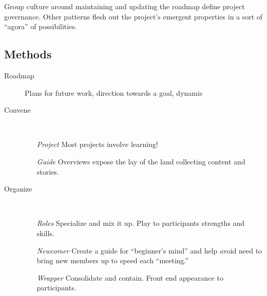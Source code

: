 \documentclass{acm_proc_article-sp}
\begin{document}
Group culture around maintaining and updating the roadmap define
project governance.  Other patterns flesh out the project's emergent
properties in a sort of ``agora'' of possibilities.

\subsection{Methods}

\hspace{.2in}
\begin{minipage}{.4\textwidth}
\begin{description}
\item[Roadmap] Plans for future work, direction towards a goal, dynamic
\item[Convene] \quad \\[-.1in]
\begin{itemize}
\item[\emph{Project}] Most projects involve learning!
\item[\emph{Guide}] Overviews expose the lay of the land collecting content
  and stories.
\end{itemize}
\end{description}
\end{minipage}

\hspace{.2in}
\begin{minipage}{.4\textwidth}
\begin{description}
\item[Organize] \quad \\[-.1in]
\begin{itemize}
\item[\emph{Roles}] Specialize and mix it up. Play to participants strengths
  and skills.
\item[\emph{Newcomer}] Create a guide for ``beginner's mind'' and help avoid
  need to bring new members up to speed each ``meeting.''
\item[\emph{Wrapper}] Consolidate and contain. Front end appearance to
  participants.
\end{itemize}
\end{description}
\end{minipage}
\end{document}
